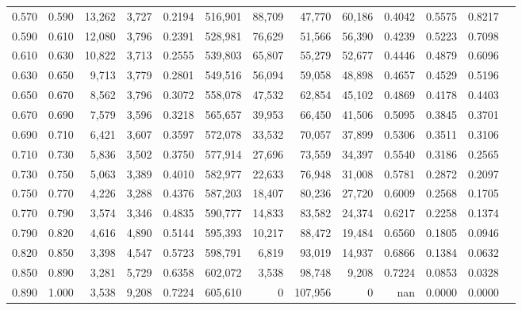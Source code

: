 \begin{tabular}{rrrrrrrrrrrrr}
0.570 & 0.590 & 13,262 & 3,727 &                                     0.2194 & 516,901 &  88,709 &  47,770 &  60,186 & 0.4042 & 0.5575 & 0.8217 \\
0.590 & 0.610 & 12,080 & 3,796 &                                     0.2391 & 528,981 &  76,629 &  51,566 &  56,390 & 0.4239 & 0.5223 & 0.7098 \\
0.610 & 0.630 & 10,822 & 3,713 &                                     0.2555 & 539,803 &  65,807 &  55,279 &  52,677 & 0.4446 & 0.4879 & 0.6096 \\
0.630 & 0.650 &  9,713 & 3,779 &                                     0.2801 & 549,516 &  56,094 &  59,058 &  48,898 & 0.4657 & 0.4529 & 0.5196 \\
0.650 & 0.670 &  8,562 & 3,796 &                                     0.3072 & 558,078 &  47,532 &  62,854 &  45,102 & 0.4869 & 0.4178 & 0.4403 \\
0.670 & 0.690 &  7,579 & 3,596 &                                     0.3218 & 565,657 &  39,953 &  66,450 &  41,506 & 0.5095 & 0.3845 & 0.3701 \\
0.690 & 0.710 &  6,421 & 3,607 &                                     0.3597 & 572,078 &  33,532 &  70,057 &  37,899 & 0.5306 & 0.3511 & 0.3106 \\
0.710 & 0.730 &  5,836 & 3,502 &                                     0.3750 & 577,914 &  27,696 &  73,559 &  34,397 & 0.5540 & 0.3186 & 0.2565 \\
0.730 & 0.750 &  5,063 & 3,389 &                                     0.4010 & 582,977 &  22,633 &  76,948 &  31,008 & 0.5781 & 0.2872 & 0.2097 \\
0.750 & 0.770 &  4,226 & 3,288 &                                     0.4376 & 587,203 &  18,407 &  80,236 &  27,720 & 0.6009 & 0.2568 & 0.1705 \\
0.770 & 0.790 &  3,574 & 3,346 &                                     0.4835 & 590,777 &  14,833 &  83,582 &  24,374 & 0.6217 & 0.2258 & 0.1374 \\
0.790 & 0.820 &  4,616 & 4,890 &                                     0.5144 & 595,393 &  10,217 &  88,472 &  19,484 & 0.6560 & 0.1805 & 0.0946 \\
0.820 & 0.850 &  3,398 & 4,547 &                                     0.5723 & 598,791 &   6,819 &  93,019 &  14,937 & 0.6866 & 0.1384 & 0.0632 \\
0.850 & 0.890 &  3,281 & 5,729 &                                     0.6358 & 602,072 &   3,538 &  98,748 &   9,208 & 0.7224 & 0.0853 & 0.0328 \\
0.890 & 1.000 &  3,538 & 9,208 &                                     0.7224 & 605,610 &       0 & 107,956 &       0 &    nan & 0.0000 & 0.0000 \\
\bottomrule
\end{tabular}
